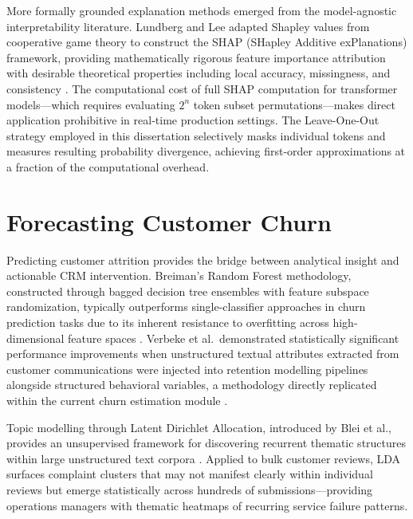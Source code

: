 \documentclass[12pt,a4paper]{report}
\begin{document}
More formally grounded explanation methods emerged from the model-agnostic interpretability literature. Lundberg and Lee adapted Shapley values from cooperative game theory to construct the SHAP (SHapley Additive exPlanations) framework, providing mathematically rigorous feature importance attribution with desirable theoretical properties including local accuracy, missingness, and consistency \cite{lundberg2017shap}. The computational cost of full SHAP computation for transformer models—which requires evaluating $2^n$ token subset permutations—makes direct application prohibitive in real-time production settings. The Leave-One-Out strategy employed in this dissertation selectively masks individual tokens and measures resulting probability divergence, achieving first-order approximations at a fraction of the computational overhead.

\section{Forecasting Customer Churn}
Predicting customer attrition provides the bridge between analytical insight and actionable CRM intervention. Breiman's Random Forest methodology, constructed through bagged decision tree ensembles with feature subspace randomization, typically outperforms single-classifier approaches in churn prediction tasks due to its inherent resistance to overfitting across high-dimensional feature spaces \cite{breiman2001random}. Verbeke et al.\ demonstrated statistically significant performance improvements when unstructured textual attributes extracted from customer communications were injected into retention modelling pipelines alongside structured behavioral variables, a methodology directly replicated within the current churn estimation module \cite{verbeke2012new}.

Topic modelling through Latent Dirichlet Allocation, introduced by Blei et al., provides an unsupervised framework for discovering recurrent thematic structures within large unstructured text corpora \cite{blei2003latent}. Applied to bulk customer reviews, LDA surfaces complaint clusters that may not manifest clearly within individual reviews but emerge statistically across hundreds of submissions—providing operations managers with thematic heatmaps of recurring service failure patterns.
\end{document}
